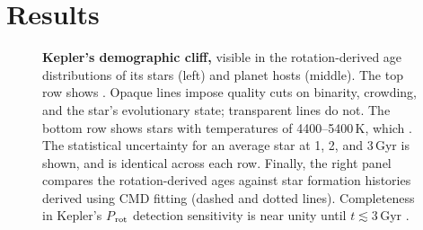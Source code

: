 \documentclass[11pt,twocolumn,tighten]{aastex63}
\begin{document}
\section{Results}
\label{sec:results}

\begin{figure}[!t]
  \begin{center}
    \leavevmode

	\vspace{-0.35cm}
%
  \end{center}
  \vspace{-0.6cm}
  \caption{{\bf Kepler's demographic cliff,} visible in the
  rotation-derived age distributions of its stars (left) and planet
  hosts (middle).  The top row shows .  Opaque lines
  impose quality cuts on binarity, crowding, and the star's
  evolutionary state; transparent lines do not.  The bottom row shows
  stars with temperatures of 4400--5400\,K, which .  The
  statistical uncertainty for an average star at 1, 2, and 3\,Gyr is
  shown, and is identical across each
  row.  
  Finally, the right panel compares the rotation-derived ages
  against star formation histories derived using CMD fitting (dashed
  and dotted lines).  Completeness in Kepler's $P$$_{\rm rot}$
  detection sensitivity is near unity until $t$$\lesssim$3\,Gyr
  \citep{2022ApJ...937...94M}.
  \label{fig:hist_tgyro}
  }
\end{figure}
\end{document}
